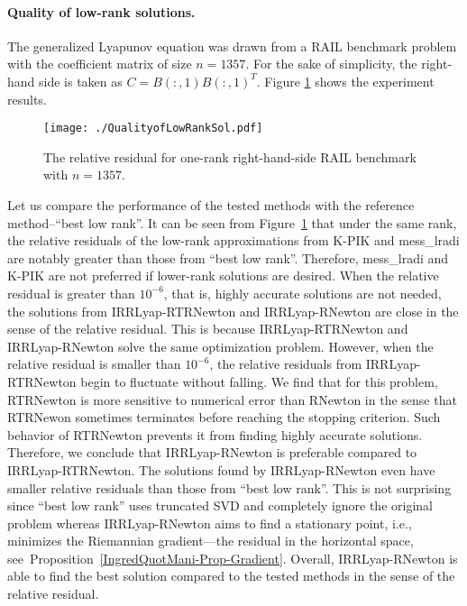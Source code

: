 \documentclass[11pt]{article}
\newcommand{\whcomm}[2]{{\sf\color{purple} #1}{\sf\color{blue} #2}}
\numberwithin{equation}{section}
\begin{document}
\paragraph{Quality of low-rank solutions.}
The generalized Lyapunov equation was drawn from a RAIL benchmark problem with the coefficient matrix of size $n=1357$. For the sake of simplicity, the right-hand side is taken as $C = B(:,1)B(:,1)^T$. Figure \ref{NumExp-QualityofLowRank} shows the experiment results.

\begin{figure}[htbp]
	\centering
	\texttt{[image: ./QualityofLowRankSol.pdf]}
	\caption{The relative residual for one-rank right-hand-side RAIL benchmark with $n=1357$.} 
	\label{NumExp-QualityofLowRank}
\end{figure}


Let us compare the performance of the tested methods with the reference method--``best low rank''.
It can be seen from Figure~\ref{NumExp-QualityofLowRank} that 
under the same rank, the relative residuals of the low-rank approximations from K-PIK and mess\_lradi are notably greater than those from ``best low rank''. Therefore, mess\_lradi and K-PIK are not preferred if lower-rank solutions are desired.
When the relative residual is greater than $10^{-6}$, that is, highly accurate solutions are not needed, the solutions from IRRLyap-RTRNewton and IRRLyap-RNewton are close in the sense of the relative residual. This is because IRRLyap-RTRNewton and IRRLyap-RNewton solve the same optimization problem. However, when the relative residual is smaller than $10^{-6}$, the relative residuals from IRRLyap-RTRNewton begin to fluctuate without falling. We find that for this problem, RTRNewton is more sensitive to numerical error than RNewton in the sense that RTRNewon sometimes terminates before reaching the stopping criterion. Such behavior of RTRNewton prevents it from finding highly accurate solutions. Therefore, we conclude that IRRLyap-RNewton is preferable compared to IRRLyap-RTRNewton.
The solutions found by IRRLyap-RNewton even have smaller relative residuals than those from ``best low rank''. This is not surprising since ``best low rank'' uses truncated SVD and completely ignore the original problem whereas IRRLyap-RNewton aims to find a stationary point, i.e., minimizes the Riemannian gradient---the residual in the horizontal space, see~Proposition~\ref{IngredQuotMani-Prop-Gradient}. Overall, IRRLyap-RNewton is able to find the best solution compared to the tested methods in the sense of the relative residual.
\end{document}
